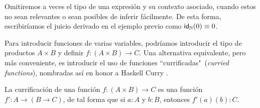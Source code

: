 \documentclass[../main.tex]{subfiles}
\begin{document}
\begin{notation}
    Omitiremos a veces el tipo de una expresión y su contexto asociado, cuando estos no sean relevantes o sean posibles de inferir fácilmente. De esta forma, escribiríamos el juicio derivado en el ejemplo previo como $\idfunc[\N] (0) \equiv 0$.
\end{notation}

Para introducir funciones de varias variables, podríamos introducir el tipo de productos $A \times B$ y definir $f: (A \times B)\to C$.
Una alternativa equivalente, pero m\'as conveniente, es introducir el uso de funciones ``currificadas"\ (\textit{curried functions}), nombradas as\'i en honor a Haskell Curry \cite{curry_philosophical_1980}.

La currificación de una funci\'on $f: (A\times B) \to C$ es una funci\'on $f': A \to (B \to C)$, de tal forma que si $a:A$ y $b:B$, entonces $f'(a)(b):C$.
\end{document}
